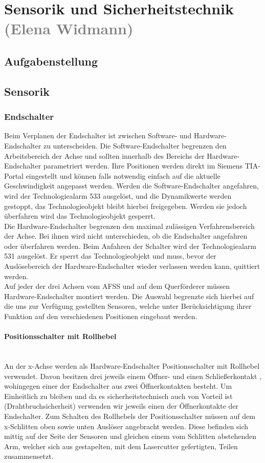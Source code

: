 \section{Sensorik und Sicherheitstechnik \textcolor{gray}{(Elena Widmann)}}

\subsection{Aufgabenstellung}

\subsection{Sensorik}

\subsubsection{Endschalter}
Beim Verplanen der Endschalter ist zwischen Software- und Hardware-Endschalter zu unterscheiden. Die Software-Endschalter begrenzen den Arbeitsbereich der Achse und sollten innerhalb des Bereichs der Hardware-Endschalter parametriert werden. Ihre Positionen werden direkt im Siemens TIA-Portal eingestellt und können falls notwendig einfach auf die aktuelle Geschwindigkeit angepasst werden. Werden die Software-Endschalter angefahren, wird der Technologiealarm 533 ausgelöst, und die Dynamikwerte werden gestoppt, das Technologieobjekt bleibt hierbei freigegeben. Werden sie jedoch überfahren wird das Technologieobjekt gesperrt. \\
Die Hardware-Endschalter begrenzen den maximal zulässigen Verfahrensbereich der Achse. Bei ihnen wird nicht unterschieden, ob die Endschalter angefahren oder überfahren werden. Beim Anfahren der Schalter wird der Technologiealarm 531 ausgelöst. Er sperrt das Technologieobjekt und muss, bevor der Auslösebereich der Hardware-Endschalter wieder verlassen werden kann, quittiert werden. \cite{axis_manual}\\
Auf jeder der drei Achsen vom AFSS und auf dem Querförderer müssen Hardware-Endschalter montiert werden. Die Auswahl begrenzte sich hierbei auf die uns zur Verfügung gestellten Sensoren, welche unter Berücksichtigung ihrer Funktion auf den verschiedenen Positionen eingebaut werden.

\paragraph{Positionsschalter mit Rollhebel} \mbox{}\\
An der x-Achse werden als Hardware-Endschalter Positionsschalter mit Rollhebel verwendet. Davon besitzen drei jeweils einem Öffner- und einen Schließerkontakt \cite{schmersal_3}, wohingegen einer der Endschalter aus zwei Öffnerkontakten besteht. \cite{schmersal_1} Um Einheitlich zu bleiben und da es sicherheitstechnisch auch von Vorteil ist (Drahtbruchsicherheit) verwenden wir jeweils einen der Öffnerkontakte der Endschalter. Zum Schalten des Rollhebels der Positionsschalter müssen auf dem x-Schlitten oben sowie unten Auslöser angebracht werden. Diese befinden sich mittig auf der Seite der Sensoren und gleichen einem vom Schlitten abstehenden Arm, welcher sich aus gestapelten, mit dem Lasercutter gefertigten, Teilen zusammensetzt.

